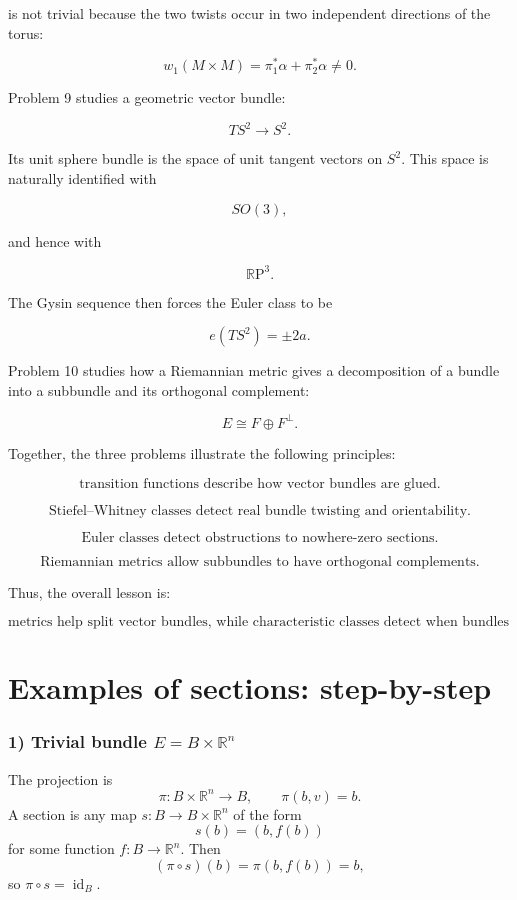 \documentclass[12pt,a4paper]{article}
\newcommand{\RP}{\mathbb{R}\mathrm{P}}
\DeclareMathOperator{\id}{id}
\theoremstyle{notespace}
\begin{document}
	is not trivial because the two twists occur in two independent directions of the torus:
	
	\[
	w_1(M\times M)=\pi_1^{*}\alpha+\pi_2^{*}\alpha\neq 0.
	\]
	
	Problem 9 studies a geometric vector bundle:
	
	\[
	TS^{2}\to S^{2}.
	\]
	
	Its unit sphere bundle is the space of unit tangent vectors on \(S^{2}\). This space is naturally identified with
	
	\[
	SO(3),
	\]
	
	and hence with
	
	\[
	\RP^{3}.
	\]
	
	The Gysin sequence then forces the Euler class to be
	
	\[
	e(TS^{2})=\pm 2a.
	\]
	
	Problem 10 studies how a Riemannian metric gives a decomposition of a bundle into a subbundle and its orthogonal complement:
	
	\[
	E\cong F\oplus F^{\perp}.
	\]
	
	Together, the three problems illustrate the following principles:
	
	\[
	\boxed{
		\text{transition functions describe how vector bundles are glued.}
	}
	\]
	
	\[
	\boxed{
		\text{Stiefel--Whitney classes detect real bundle twisting and orientability.}
	}
	\]
	
	\[
	\boxed{
		\text{Euler classes detect obstructions to nowhere-zero sections.}
	}
	\]
	
	\[
	\boxed{
		\text{Riemannian metrics allow subbundles to have orthogonal complements.}
	}
	\]
	
	Thus, the overall lesson is:
	
	\[
	\boxed{
		\text{metrics help split vector bundles, while characteristic classes detect when bundles cannot be globally trivialized.}
	}
	\]
	
\section{Examples of sections: step-by-step}

\subsubsection*{1) Trivial bundle $E=B\times \mathbb{R}^n$}

The projection is
\[
\pi:B\times \mathbb{R}^n\to B,\qquad \pi(b,v)=b.
\]
A section is any map $s:B\to B\times \mathbb{R}^n$ of the form
\[
s(b)=(b,f(b))
\]
for some function $f:B\to \mathbb{R}^n$. Then
\[
(\pi\circ s)(b)=\pi(b,f(b))=b,
\]
so $\pi\circ s=\id_B$.
\end{document}
